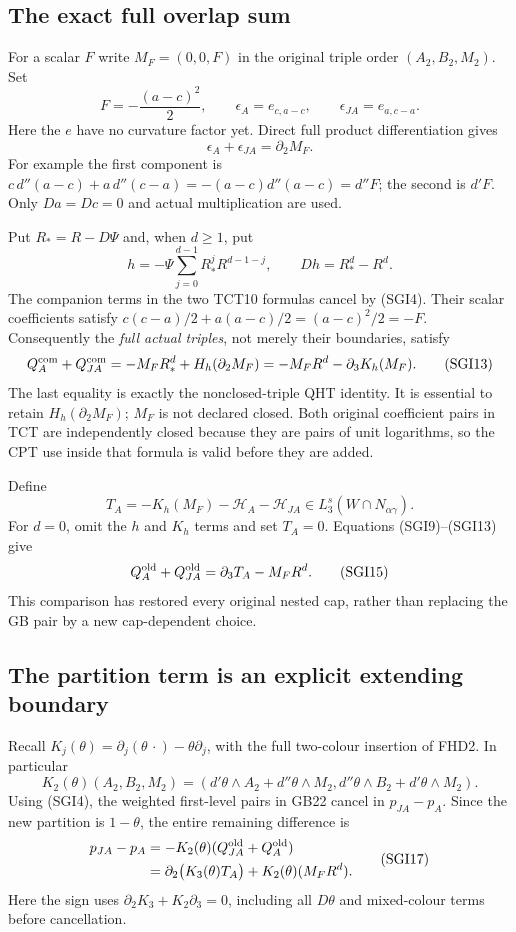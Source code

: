 \subsection{The exact full overlap sum}

For a scalar $F$ write $M_F=(0,0,F)$ in the original triple order
$(A_2,B_2,M_2)$.  Set
\[
 F=-\frac{(a-c)^2}{2},\qquad
 \epsilon_A=e_{c,a-c},\qquad
 \epsilon_{JA}=e_{a,c-a}.
 \tag{SGI10}
\]
Here the $e$ have no curvature factor yet.  Direct full product
differentiation gives
\[
                   \epsilon_A+\epsilon_{JA}=\partial_2M_F.
 \tag{SGI11}
\]
For example the first component is
$c\,d''(a-c)+a\,d''(c-a)
=-(a-c)d''(a-c)=d''F$; the second is $d'F$.
Only $Da=Dc=0$ and actual multiplication are used.

Put $R_*=R-D\Psi$ and, when $d\ge1$, put
\[
        h=-\Psi\sum_{j=0}^{d-1}R_*^jR^{d-1-j},
                 \qquad Dh=R_*^d-R^d.
 \tag{SGI12}
\]
The companion terms in the two TCT10 formulas cancel by (SGI4).
Their scalar coefficients satisfy
$c(c-a)/2+a(a-c)/2=(a-c)^2/2=-F$.
Consequently the \emph{full actual triples}, not merely their
boundaries, satisfy
\[
 Q_A^{\rm com}+Q_{JA}^{\rm com}
      =-M_F R_*^d+H_h(\partial_2M_F)
      =-M_F R^d-\partial_3K_h(M_F).
 \tag{SGI13}
\]
The last equality is exactly the nonclosed-triple QHT identity.
It is essential to retain $H_h(\partial_2M_F)$; $M_F$ is not
declared closed.  Both original coefficient pairs in TCT are
independently closed because they are pairs of unit logarithms,
so the CPT use inside that formula is valid before they are added.

Define
\[
 T_A=-K_h(M_F)-\mathcal H_A-\mathcal H_{JA}
                         \in L_3^s(W\cap N_{\alpha\gamma}).
 \tag{SGI14}
\]
For $d=0$, omit the $h$ and $K_h$ terms and set $T_A=0$.
Equations (SGI9)--(SGI13) give
\[
                  Q_A^{\rm old}+Q_{JA}^{\rm old}
                      =\partial_3T_A-M_F R^d.
 \tag{SGI15}
\]
This comparison has restored every original nested cap, rather
than replacing the GB pair by a new cap-dependent choice.

\subsection{The partition term is an explicit extending boundary}

Recall $K_j(\theta)=\partial_j(\theta\,\cdot)
-\theta\partial_j$, with the full two-colour insertion of FHD2.
In particular
\[
 K_2(\theta)(A_2,B_2,M_2)
 =(d'\theta\wedge A_2+d''\theta\wedge M_2,
   d''\theta\wedge B_2+d'\theta\wedge M_2).
 \tag{SGI16}
\]
Using (SGI4), the weighted first-level pairs in GB22 cancel in
$p_{JA}-p_A$.  Since the new partition is $1-\theta$, the entire
remaining difference is
\[
 \begin{split}
 p_{JA}-p_A
  &=-K_2(\theta)(Q_{JA}^{\rm old}+Q_A^{\rm old})\\
  &=\partial_2\bigl(K_3(\theta)T_A\bigr)
                           +K_2(\theta)(M_F R^d).
 \end{split}
 \tag{SGI17}
\]
Here the sign uses $\partial_2K_3+K_2\partial_3=0$, including
all $D\theta$ and mixed-colour terms before cancellation.

